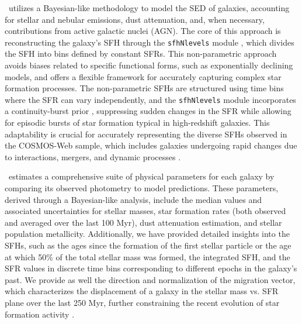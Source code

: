 \documentclass[longauth]{aa}
\begin{document}
\cigale\ utilizes a Bayesian-like methodology to model the SED of galaxies, accounting for stellar and nebular emissions, dust attenuation, and, when necessary, contributions from active galactic nuclei (AGN). The core of this approach is reconstructing the galaxy's SFH through the \texttt{sfhNlevels} module \citep{Ciesla2023,Ciesla2024a}, which divides the SFH into bins defined by constant SFRs. This non-parametric approach avoids biases related to specific functional forms, such as exponentially declining models, and offers a flexible framework for accurately capturing complex star formation processes. The non-parametric SFHs are structured using time bins where the SFR can vary independently, and the \texttt{sfhNlevels} module incorporates a continuity-burst prior \citep{Leja19,Tacchella22}, suppressing sudden changes in the SFR while allowing for episodic bursts of star formation typical in high-redshift galaxies. This adaptability is crucial for accurately representing the diverse SFHs observed in the COSMOS-Web sample, which includes galaxies undergoing rapid changes due to interactions, mergers, and dynamic processes \citep{scoville_cosmic_2007,kartaltepe15b,davidzon_cosmos2015_2017}. 

\cigale\ estimates a comprehensive suite of physical parameters for each galaxy by comparing its observed photometry to model predictions. These parameters, derived through a Bayesian-like analysis, include the median values and associated uncertainties for stellar masses, star formation rates (both observed and averaged over the last 100 Myr), dust attenuation estimation, and stellar population metallicity. Additionally, we have provided detailed insights into the SFHs, such as the ages since the formation of the first stellar particle or the age at which 50\% of the total stellar mass was formed, the integrated SFH, and the SFR values in discrete time bins corresponding to different epochs in the galaxy's past. We provide as well the direction and normalization of the migration vector, which characterizes the displacement of a galaxy in the stellar mass vs. SFR plane over the last 250 Myr, further constraining the recent evolution of star formation activity \citep[see][for more details]{Arango-Toro2024}.
\end{document}
